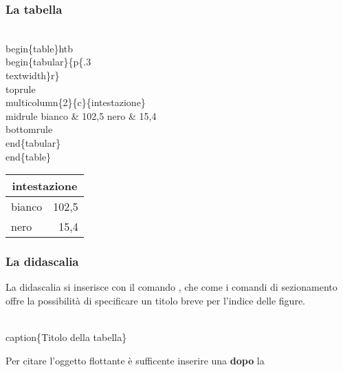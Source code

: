\documentclass[svgnames,%
	ucs,%
	pdftex]{guitbeamer}
\begin{document}
\begin{frame}
  \frametitle{La tabella}
	\begin{LaTeXcode}
		\\begin\{table\}\alert{\tls htb\trs}\n
		\\begin\{tabular\}\{p\{.3\\textwidth\}r\}\
		\\toprule \n
		\\multicolumn\{2\}\{c\}\{intestazione\}\bs\bs \
		\\midrule \n
		\hspace*{5ex}bianco \& 102,5 \bs\bs\n
		\hspace*{5ex}nero   \& 15,4 \bs\bs\
		\\bottomrule\n
		\\end\{tabular\}\n
		\\end\{table\}
	\end{LaTeXcode}
	\begin{LaTeXoutput}\centering
		\begin{tabular}{p{.3\textwidth}r}\hline
		\multicolumn{2}{c}{intestazione}\\\hline
		bianco & 102,5 \\
		nero   & 15,4 \\\hline
		\end{tabular}
	\end{LaTeXoutput}
\end{frame}
\begin{frame}
  \frametitle{La didascalia}
	La didascalia si inserisce con il comando \LCmd{caption}, che come i comandi di sezionamento offre la possibilit\`a di specificare un titolo breve per l'indice delle figure.
	\begin{LaTeXcode}
		\alert{\\caption\{}Titolo della tabella\alert{\}}
	\end{LaTeXcode}
  \medskip
 	 Per citare l'oggetto flottante \`e sufficente inserire una  \textbf{dopo} la \\
\end{frame}
\end{document}
